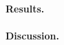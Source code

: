 \lipsum[14][1-3]

\paragraph{Results.}

\lipsum[15][1-5]

\paragraph{Discussion.}

\lipsum[16][1-4]
